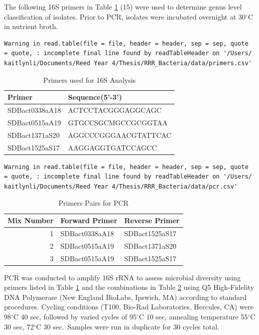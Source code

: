 \documentclass[12pt,twoside]{reedthesis}
\begin{document}
The following 16S primers in Table \ref{tab:primers} (15) were used to determine genus level classification of isolates. Prior to PCR, isolates were incubated overnight at 30\(^{\circ}\)C in nutrient broth.
\begin{verbatim}
Warning in read.table(file = file, header = header, sep = sep, quote
= quote, : incomplete final line found by readTableHeader on '/Users/
kaitlynli/Documents/Reed Year 4/Thesis/RRR_Bacteria/data/primers.csv'
\end{verbatim}
\begin{longtable}[t]{ll}
\caption[Primers]{\label{tab:primers}Primers used for 16S Analysis}\\
\toprule
Primer & Sequence(5'-3')\\
\midrule
SDBact0338aA18 & ACTCCTACGGGAGGCAGC\\
SDBact0515aA19 & GTGCCSGCMGCCGCGGTAA\\
SDBact1371aS20 & AGGCCCGGGAACGTATTCAC\\
SDBact1525aS17 & AAGGAGGTGATCCAGCC\\
\bottomrule
\end{longtable}
\begin{verbatim}
Warning in read.table(file = file, header = header, sep = sep, quote
= quote, : incomplete final line found by readTableHeader on '/Users/
kaitlynli/Documents/Reed Year 4/Thesis/RRR_Bacteria/data/pcr.csv'
\end{verbatim}
\begin{longtable}[t]{rll}
\caption[Primer Pairs]{\label{tab:pcr}Primers Pairs for PCR}\\
\toprule
Mix Number & Forward Primer & Reverse Primer\\
\midrule
1 & SDBact0338aA18 & SDBact1525aS17\\
2 & SDBact0515aA19 & SDBact1371aS20\\
3 & SDBact0515aA19 & SDBact1525aS17\\
\bottomrule
\end{longtable}
PCR was conducted to amplify 16S rRNA to assess microbial diversity using primers listed in Table \ref{tab:primers} and the combinations in Table \ref{tab:pcr} using Q5 High-Fidelity DNA Polymerase (New England BioLabs, Ipswich, MA) according to standard procedures. Cycling conditions (T100, Bio-Rad Laboratories, Hercules, CA) were 98\(^{\circ}\)C 40 sec, followed by varied cycles of 95\(^{\circ}\)C 10 sec, annealing temperature 55\(^{\circ}\)C 30 sec, 72\(^{\circ}\)C 30 sec.~Samples were run in duplicate for 30 cycles total.
\end{document}
